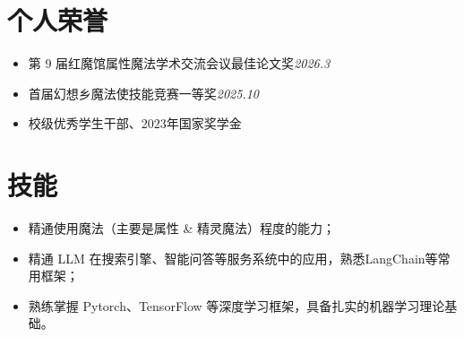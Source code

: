 \documentclass[watermark=true]{hitresume}
\begin{document}
\begin{minipage}[t]{0.49\linewidth}
    \section{个人荣誉}
        \begin{itemize}
            \item 第 9 届红魔馆属性魔法学术交流会议最佳论文奖\hfill\textit{2026.3}
            \item 首届幻想乡魔法使技能竞赛一等奖\hfill\textit{2025.10} %
            \item 校级优秀学生干部、2023年国家奖学金
    \end{itemize}
\end{minipage}
\hfill
\begin{minipage}[t]{0.49\linewidth}
    \section{技能}
    \begin{itemize}
        \item \textcolor{HITBlueAux2}{精通使用魔法（主要是属性 \& 精灵魔法）程度的能力}；
        \item 精通 LLM 在搜索引擎、智能问答等服务系统中的应用，熟悉LangChain等常用框架；
        \item 熟练掌握 Pytorch、TensorFlow 等深度学习框架，具备扎实的机器学习理论基础。
    \end{itemize}
\end{minipage}
\end{document}
